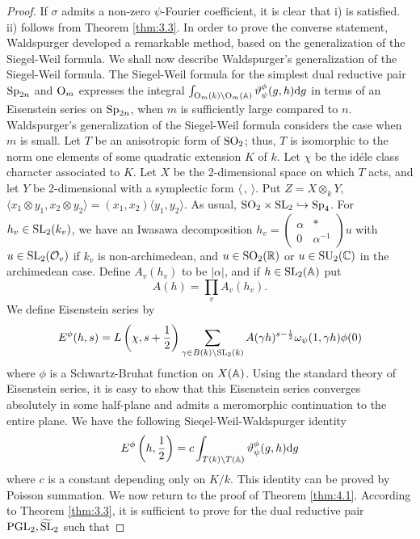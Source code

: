 \begin{proof}
If $\sigma$ admits a non-zero $\psi$-Fourier coefficient, it is clear that i) is satisfied.
ii) follows from Theorem \ref{thm:3.3}.
In order to prove the converse statement, Waldspurger developed a remarkable method, based on the generalization of the Siegel-Weil formula.
We shall now describe Waldspurger's generalization of the Siegel-Weil formula.
The Siegel-Weil formula for the simplest dual reductive pair $\mathrm{Sp}_{2n}$ and $\mathrm{O}_{m}$ expresses the integral $\int_{\mathrm{O}_{m}(k) \backslash \mathrm{O}_{m}(\mathbb{A})} \vartheta_\psi^\phi(g, h) \mathrm{d} g$
in terms of an Eisenstein series on $\mathrm{Sp}_{2n}$, when $m$ is sufficiently large compared to $n$.
Waldspurger's generalization of the Siegel-Weil formula considers the case when $m$ is small.
Let $T$ be an anisotropic form of $\mathrm{SO}_2$; thus, $T$ is isomorphic to the norm one elements of some quadratic extension $K$ of $k$.
Let $\chi$ be the id\'ele class character associated to $K$. 
Let $X$ be the 2-dimensional space on which $T$ acts, and let $Y$ be 2-dimensional with a symplectic form $\langle \,,\,\rangle$.
Put $Z = X \otimes_k Y$, $\langle x_1 \otimes y_1, x_2 \otimes y_2 \rangle = (x_1, x_2) \langle y_1, y_2 \rangle$.
As usual, $\mathrm{SO}_2 \times \mathrm{SL}_2 \hookrightarrow \mathrm{Sp}_4$.
For $h_v \in \mathrm{SL}_2(k_v)$, we have an Iwasawa decomposition $h_v = \left(\begin{smallmatrix}
    \alpha & * \\ 0 & \alpha^{-1}
\end{smallmatrix}\right) u$ with $u \in \mathrm{SL}_2(\mathcal{O}_v)$ if $k_v$ is non-archimedean, and $u \in \mathrm{SO}_2(\mathbb{R})$ or $u \in \mathrm{SU}_2(\mathbb{C})$ in the archimedean case.
Define $A_v(h_v)$ to be $|\alpha|$, and if $h \in \mathrm{SL}_2(\mathbb{A})$ put
\[
A(h) = \prod_v A_v(h_v).
\]
We define Eisenstein series by
\[
E^\phi(h, s) = L\left(\chi, s + \frac{1}{2}\right) \sum_{\gamma \in B(k) \backslash \mathrm{SL}_2(k)} A(\gamma h)^{s - \frac{1}{2}}\omega_\psi(1, \gamma h)\phi(0)
\]
where $\phi$ is a Schwartz-Bruhat function on $X(\mathbb{A})$.
Using the standard theory of Eisenstein series, it is easy to show that this Eisenstein series converges absolutely in some half-plane and admits a meromorphic continuation to the entire plane.
We have the following Sieqel-Weil-Waldspurger identity
\[
E^\phi\left(h, \frac{1}{2}\right) = c \int_{T(k) \backslash T(\mathbb{A})} \vartheta_\psi^\phi(g, h) \mathrm{d} g
\]
where $c$ is a constant depending only on $K/k$. This identity can be proved by Poisson summation.
We now return to the proof of Theorem \ref{thm:4.1}.
According to Theorem \ref{thm:3.3}, it is sufficient to prove for the dual reductive pair $\mathrm{PGL}_2, \widetilde{\mathrm{SL}}_2$ such that

\end{proof}
